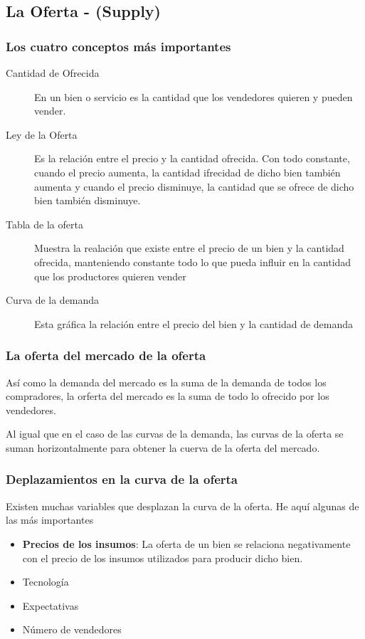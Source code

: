 \subsection{La Oferta - (Supply)}

\subsubsection{Los cuatro conceptos más importantes}
\begin{description}
\item[Cantidad de Ofrecida] En un bien o servicio es la cantidad que los vendedores quieren y pueden vender.
\item[Ley de la Oferta] Es la relación entre el precio y la cantidad ofrecida. Con todo constante, cuando el precio aumenta, la cantidad ifrecidad de dicho bien también aumenta y cuando el precio disminuye, la cantidad que se ofrece de dicho bien también disminuye.
\item[Tabla de la oferta] Muestra la realación que existe entre el precio de un bien y la cantidad ofrecida, manteniendo constante todo lo que pueda influir en la cantidad que los productores quieren vender
\item[Curva de la demanda] Esta gráfica la relación entre el precio del bien y la cantidad de demanda  
\end{description}

\subsubsection{La oferta del mercado de la oferta}
Así como la demanda del mercado es la suma de la demanda de todos los compradores, la orferta del mercado es la suma de todo lo ofrecido por los vendedores.
\par Al igual que en el caso de las curvas de la demanda, las curvas de la oferta se suman horizontalmente para obtener la cuerva de la oferta del mercado.

\subsubsection{Deplazamientos en la curva de la oferta}
Existen muchas variables que desplazan la curva de la oferta. He aquí algunas de las más importantes

\begin{itemize}
\item{{\bf Precios de los insumos}: La oferta de un bien se relaciona negativamente con el precio de los insumos utilizados para producir dicho bien.}
\item{Tecnología}
\item{Expectativas}
\item{Número de vendedores}
\end{itemize}


